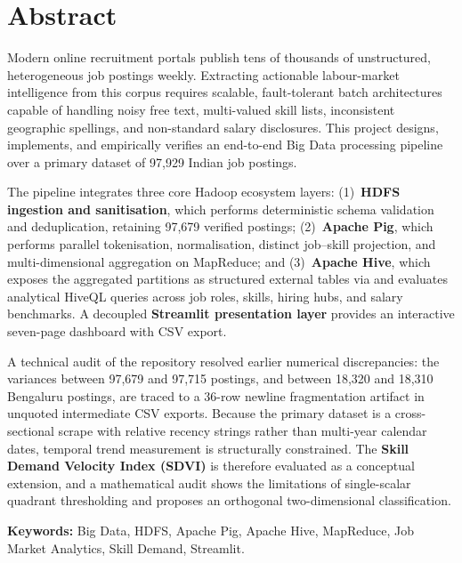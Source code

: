 \documentclass[10pt,a4paper]{article}
\newcommand{\code}[1]{\texttt{\small\detokenize{#1}}}
\begin{document}
\section*{Abstract}

Modern online recruitment portals publish tens of thousands of unstructured, heterogeneous job postings weekly. Extracting actionable labour-market intelligence from this corpus requires scalable, fault-tolerant batch architectures capable of handling noisy free text, multi-valued skill lists, inconsistent geographic spellings, and non-standard salary disclosures. This project designs, implements, and empirically verifies an end-to-end Big Data processing pipeline over a primary dataset of 97,929 Indian job postings.

The pipeline integrates three core Hadoop ecosystem layers: (1)~\textbf{HDFS ingestion and sanitisation}, which performs deterministic schema validation and deduplication, retaining 97,679 verified postings; (2)~\textbf{Apache Pig}, which performs parallel tokenisation, normalisation, distinct job--skill projection, and multi-dimensional aggregation on MapReduce; and (3)~\textbf{Apache Hive}, which exposes the aggregated partitions as structured external tables via \code{OpenCSVSerde} and evaluates analytical HiveQL queries across job roles, skills, hiring hubs, and salary benchmarks. A decoupled \textbf{Streamlit presentation layer} provides an interactive seven-page dashboard with CSV export.

A technical audit of the repository resolved earlier numerical discrepancies: the variances between 97,679 and 97,715 postings, and between 18,320 and 18,310 Bengaluru postings, are traced to a 36-row newline fragmentation artifact in unquoted intermediate CSV exports. Because the primary dataset is a cross-sectional scrape with relative recency strings rather than multi-year calendar dates, temporal trend measurement is structurally constrained. The \textbf{Skill Demand Velocity Index (SDVI)} is therefore evaluated as a conceptual extension, and a mathematical audit shows the limitations of single-scalar quadrant thresholding and proposes an orthogonal two-dimensional classification.

\vspace{0.5cm}
\textbf{Keywords:} Big Data, HDFS, Apache Pig, Apache Hive, MapReduce, Job Market Analytics, Skill Demand, Streamlit.

\vspace{0.5cm}
\tableofcontents
\newpage
\end{document}
